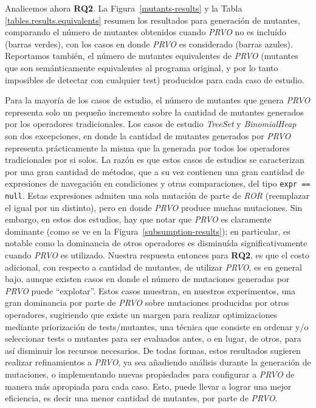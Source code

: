 Analicemos ahora \textbf{RQ2}. La Figura~\ref{mutants-results} y la Tabla \ref{tables.results.equivalents} resumen los resultados para generaci\'on de mutantes, comparando el n\'umero de mutantes obtenidos cuando \emph{PRVO} no es inclu\'ido (barras verdes), con los casos en donde \emph{PRVO} es considerado (barras azules). Reportamos tambi\'en, el n\'umero de mutantes equivalentes de \emph{PRVO} (mutantes que son sem\'anticamente equivalentes al programa original, y por lo tanto imposibles de detectar con cualquier test) producidos para cada caso de estudio.

Para la mayor\'ia de los casos de estudio, el n\'umero de mutantes que genera \emph{PRVO} representa solo un peque\~no incremento sobre la cantidad de mutantes generados por los operadores tradicionales. Los casos de estudio \emph{TreeSet} y \emph{BinomialHeap} son dos excepciones, en donde la cantidad de mutantes generados por \emph{PRVO} representa pr\'acticamente la misma que la generada por todos los operadores tradicionales por si solos. La raz\'on es que estos casos de estudios se caracterizan por una gran cantidad de m\'etodos, que a su vez contienen una gran cantidad de expresiones de navegaci\'on en condiciones y otras comparaciones, del tipo \texttt{expr == null}. Estas expresiones admiten una sola mutaci\'on de parte de \emph{ROR} (reemplazar el igual por un distinto), pero en donde \emph{PRVO} produce muchas mutaciones. Sin embargo, en estos dos estudios, hay que notar que \emph{PRVO} es claramente dominante (como se ve en la Figura~\ref{subsumption-results}); en particular, es notable como la dominancia de otros operadores es disminu\'ida significativamente cuando \emph{PRVO} es utilizado. Nuestra respuesta entonces para \textbf{RQ2}, es que el costo adicional, con respecto a cantidad de mutantes, de utilizar \emph{PRVO}, es en general bajo, aunque existen casos en donde el n\'umero de mutaciones generadas por \emph{PRVO} puede ``explotar''. Estos casos muestran, en nuestros experimentos, una gran dominancia por parte de \emph{PRVO} sobre mutaciones producidas por otros operadores, sugiriendo que existe un margen para realizar optimizaciones mediante priorizaci\'on de tests/mutantes, una t\'ecnica que consiste en ordenar y/o seleccionar tests o mutantes para ser evaluados antes, o en lugar, de otros, para as\'i disminuir los recursos necesarios. De todas formas, estos resultados sugieren realizar refinamientos a \emph{PRVO}, ya sea a\~nadiendo an\'alisis durante la generaci\'on de mutaciones, o implementando nuevas propiedades para configurar a \emph{PRVO} de manera m\'as apropiada para cada caso. Esto, puede llevar a lograr una mejor eficiencia, es decir una menor cantidad de mutantes, por parte de \emph{PRVO}.


